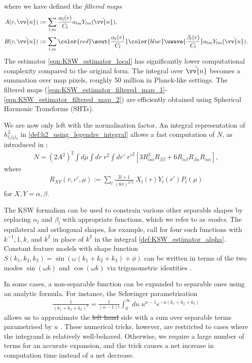 \documentclass[a4paper,12pt,times,custombib,print,index]{Classes/PhDThesisPSnPDF} %
\providecommand{\DIFadd}[1]{{\protect\color{blue}\uwave{#1}}} %
\providecommand{\DIFdel}[1]{{\protect\color{red}\sout{#1}}}                      %
\providecommand{\DIFaddbegin}{} %
\providecommand{\DIFaddend}{} %
\providecommand{\DIFdelbegin}{} %
\providecommand{\DIFdelend}{} %
\newcommand{\DIFscaledelfig}{0.5}
\newlength{\DIFdelgraphicswidth} %
\newlength{\DIFdelgraphicsheight} %
\newcommand{\DIFaddincludegraphics}[2][]{{\color{blue}\fbox{\DIFOincludegraphics[#1]{#2}}}} %
\newcommand{\DIFdelincludegraphics}[2][]{%
\sbox{\DIFdelgraphicsbox}{\DIFOincludegraphics[#1]{#2}}%
\settoboxwidth{\DIFdelgraphicswidth}{\DIFdelgraphicsbox} %
\settoboxtotalheight{\DIFdelgraphicsheight}{\DIFdelgraphicsbox} %
\scalebox{\DIFscaledelfig}{%
\parbox[b]{\DIFdelgraphicswidth}{\usebox{\DIFdelgraphicsbox}\\[-\baselineskip] \rule{\DIFdelgraphicswidth}{0em}}\llap{\resizebox{\DIFdelgraphicswidth}{\DIFdelgraphicsheight}{%
\setlength{\unitlength}{\DIFdelgraphicswidth}%
\begin{picture}(1,1)%
\thicklines\linethickness{2pt} %
{\color[rgb]{1,0,0}\put(0,0){\framebox(1,1){}}}%
{\color[rgb]{1,0,0}\put(0,0){\line( 1,1){1}}}%
{\color[rgb]{1,0,0}\put(0,1){\line(1,-1){1}}}%
\end{picture}%
}\hspace*{3pt}}} %
} %
\DeclareRobustCommand{\DIFaddbegin}{\DIFOaddbegin \let\includegraphics\DIFaddincludegraphics} %
\DeclareRobustCommand{\DIFaddend}{\DIFOaddend \let\includegraphics\DIFOincludegraphics} %
\DeclareRobustCommand{\DIFdelbegin}{\DIFOdelbegin \let\includegraphics\DIFdelincludegraphics} %
\DeclareRobustCommand{\DIFdelend}{\DIFOaddend \let\includegraphics\DIFOincludegraphics} %
\begin{document}
where we have defined the \textit{filtered maps}
\begin{align}
	A(r,\hat{\vv{n}}) &:= \sum_{l,m} \frac{\alpha_l(r)}{C_l} a_{lm} Y_{lm}(\hat{\vv{n}}), \label{eqn:KSW_estimator_filtered_map_1}\\
	B(r,\hat{\vv{n}}) &:= \sum_{l,m} \DIFdelbegin \DIFdel{\frac{\alpha_l(r)}{C_l} }\DIFdelend \DIFaddbegin \DIFadd{\frac{\beta_l(r)}{C_l} }\DIFaddend a_{lm} Y_{lm}(\hat{\vv{n}}). \label{eqn:KSW_estimator_filtered_map_2}
\end{align}
The estimator \eqref{eqn:KSW_estimator_local} has significantly lower computational complexity compared to the original form. The integral over $\hat{\vv{n}}$ becomes a summation over map pixels, roughly 50 million in Planck-like settings. The filtered maps (\ref{eqn:KSW_estimator_filtered_map_1}-\ref{eqn:KSW_estimator_filtered_map_2}) are efficiently obtained using Spherical Harmonic Transforms (SHTs).

We are now only left with the normalisation factor. An integral representation of $h^2_{l_1 l_2 l_3}$ in \eqref{def:h2_using_legendre_integral} allows a fast computation of $N$, as introduced in \cite{Smith2011};
\begin{align}
	N = (2A^2)^2 \int d\mu \int dr \;r^2 \int dr' \; r'^2 \left[ 3R_{\alpha\alpha}^2 R_{\beta\beta} + 6R_{\alpha\beta} R_{\beta\alpha} R_{\alpha\alpha} \right],
\end{align}
where
\begin{align}
	R_{XY} (r,r',\mu) := \sum_l \frac{2l+1}{(8\pi)^{2/3}} \; X_l (r) Y_l (r') P_l(\mu)
\end{align}
for $X,Y=\alpha,\beta$.

The KSW formalism can be used to constrain various other separable shapes by replacing $\alpha_l$ and $\beta_l$ with appropriate functions, which we refer to as \textit{modes}. The equilateral and orthogonal shapes, for example, call for four such functions with $k^{-1}, 1, k$, and $k^2$ in place of $k^2$ in the integral \eqref{def:KSW_estimator_alpha}. Constant feature models with shape function $S(k_1,k_2,k_3) = \sin(\omega(k_1+k_2+k_3)+\phi)$ can be written in terms of the two modes $\sin(\omega k)$ and $\cos(\omega k)$ via trigonometric identities \cite{Munchmeyer2014}.

In some cases, a non-separable function can be expanded to separable ones using an analytic formula. For instance, the Schwinger parametrisation
\begin{align}
	\frac{1}{(k_1+k_2+k_3)^n} = \frac{1}{(n-1)!} \int_0^{\infty} du \; u^{n-1} e^{-u(k_1+k_2+k_3)}
\end{align}
allows us to approximate the \DIFdelbegin \DIFdel{left hand }\DIFdelend \DIFaddbegin \DIFadd{left-hand }\DIFaddend side with a sum over separable terms parametrised by $u$ \cite{Smith2011}. These numerical tricks, however, are restricted to cases where the integrand is relatively well-behaved. Otherwise, we require a large number of terms for an accurate expansion, and the trick causes a net increase in computation time instead of a net decrease.
\end{document}
